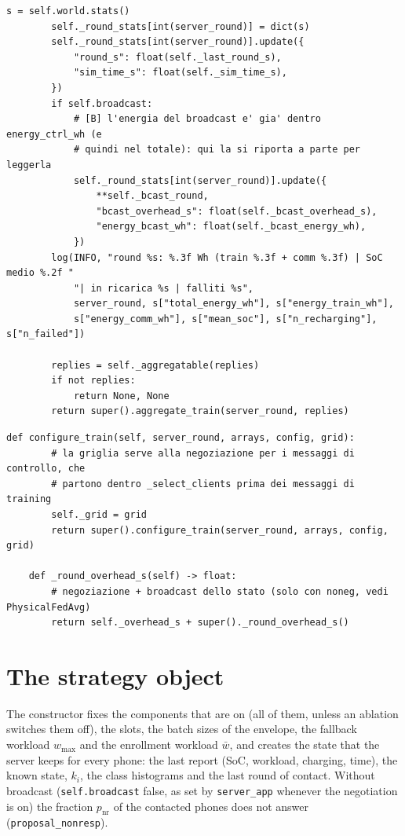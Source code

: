 \documentclass[11pt,a4paper]{article}
\newcommand{\cf}[1]{\texttt{#1}}
\begin{document}
\begin{lstlisting}[style=py,firstnumber=297,caption={\texttt{tesifl/strategies/fedavg.py}, lines 297--361}]
        s = self.world.stats()
        self._round_stats[int(server_round)] = dict(s)
        self._round_stats[int(server_round)].update({
            "round_s": float(self._last_round_s),
            "sim_time_s": float(self._sim_time_s),
        })
        if self.broadcast:
            # [B] l'energia del broadcast e' gia' dentro energy_ctrl_wh (e
            # quindi nel totale): qui la si riporta a parte per leggerla
            self._round_stats[int(server_round)].update({
                **self._bcast_round,
                "bcast_overhead_s": float(self._bcast_overhead_s),
                "energy_bcast_wh": float(self._bcast_energy_wh),
            })
        log(INFO, "round %s: %.3f Wh (train %.3f + comm %.3f) | SoC medio %.2f "
            "| in ricarica %s | falliti %s",
            server_round, s["total_energy_wh"], s["energy_train_wh"],
            s["energy_comm_wh"], s["mean_soc"], s["n_recharging"], s["n_failed"])

        replies = self._aggregatable(replies)
        if not replies:
            return None, None
        return super().aggregate_train(server_round, replies)
\end{lstlisting}

\begin{lstlisting}[style=py,firstnumber=333,caption={\texttt{tesifl/strategies/sage\_smart.py}, lines 333--341}]
    def configure_train(self, server_round, arrays, config, grid):
        # la griglia serve alla negoziazione per i messaggi di controllo, che
        # partono dentro _select_clients prima dei messaggi di training
        self._grid = grid
        return super().configure_train(server_round, arrays, config, grid)

    def _round_overhead_s(self) -> float:
        # negoziazione + broadcast dello stato (solo con noneg, vedi PhysicalFedAvg)
        return self._overhead_s + super()._round_overhead_s()
\end{lstlisting}

\newpage
\section{The strategy object}
\label{sec:init}

The constructor fixes the components that are on (all of them, unless an
ablation switches them off), the slots, the batch sizes of the envelope, the
fallback workload $w_{\max}$ and the enrollment workload $\bar{w}$, and creates
the state that the server keeps for every phone: the last report (SoC,
workload, charging, time), the known state, $k_i$, the class histograms and
the last round of contact. Without broadcast (\cf{self.broadcast} false, as set
by \cf{server\_app} whenever the negotiation is on) the fraction $p_{\mathrm{nr}}$
of the contacted phones does not answer (\cf{proposal\_nonresp}).
\end{document}
